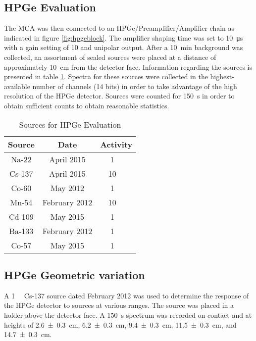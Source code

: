 \documentclass[12pt]{article}
\begin{document}
\subsection{HPGe Evaluation}
The MCA was then connected to an HPGe/Preamplifier/Amplifier chain as indicated in figure \ref{fig:hpgeblock}. The amplifier shaping time was set to \SI{10}{\micro\second} with a gain setting of 10 and unipolar output. After a \SI{10}{\minute} background was collected, an assortment of sealed sources were placed at a distance of approximately \SI{10}{\centi\meter} from the detector face. Information regarding the sources is presented in table \ref{tab:hpgesources}. Spectra for these sources were collected in the highest-available number of channels (14 bits) in order to take advantage of the high resolution of the HPGe detector. Sources were counted for \SI{150}{\second} in order to obtain sufficient counts to obtain reasonable statistics.

\begin{center}
\begin{table}
	\centering
	\caption{Sources for HPGe Evaluation\label{tab:hpgesources}}
	\begin{tabular}{c c c}
		\hline\hline
		Source & Date & Activity \\
		\hline
		Na-22 & April 2015 & \SI{1}{\micro\curie} \\
		Cs-137 & April 2015 & \SI{10}{\micro\curie} \\
		Co-60 & May 2012 & \SI{1}{\micro\curie} \\
		Mn-54 & February 2012 & \SI{10}{\micro\curie} \\
		Cd-109 & May 2015 & \SI{1}{\micro\curie} \\
		Ba-133 & February 2012 & \SI{1}{\micro\curie} \\
		Co-57 & May 2015 & \SI{1}{\micro\curie} \\
		\hline
	\end{tabular}
\end{table}
\end{center}

\subsection{HPGe Geometric variation}
A \SI{1}{\micro\curie} Cs-137 source dated February 2012 was used to determine the response of the HPGe detector to sources at various ranges. The source was placed in a holder above the detector face. A \SI{150}{\second} spectrum was recorded on contact and at heights of \SI{2.6\pm.3}{\centi\meter}, \SI{6.2\pm.3}{\centi\meter}, \SI{9.4\pm.3}{\centi\meter}, \SI{11.5\pm.3}{\centi\meter}, and \SI{14.7\pm.3}{\centi\meter}.
\end{document}
